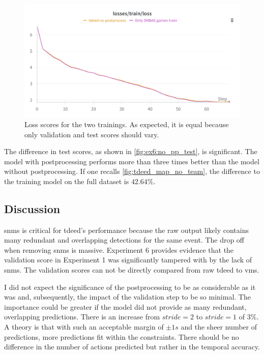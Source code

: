 \begin{figure}
    \centering
    \includegraphics[width=0.75\linewidth]{figures/no_pprocess_loss.png}
    \caption{Loss scores for the two trainings. As expected, it is equal because only validation and test scores should vary.}
    \label{fig:ex6:no_pp_loss}
\end{figure}

The difference in test scores, as shown in \cref{fig:ex6:no_pp_test}, is significant. The model with postprocessing performs more than three times better than the model without postprocessing. If one recalls \cref{fig:tdeed_map_no_team}, the difference to the training model on the full dataset is $42.64\%$. 

\subsection{Discussion}
\label{ssec:ex6_discussion}

\acrfull{snms} is critical for \acrshort{tdeed}'s performance because the raw output likely contains many redundant and overlapping detections for the same event. The drop off when removing \acrshort{snms} is massive. Experiment 6 provides evidence that the validation score in Experiment 1 was significantly tampered with by the lack of \acrshort{snms}. The validation scores can not be directly compared from raw \acrshort{tdeed} to \acrshort{vms}. 

I did not expect the significance of the postprocessing to be as considerable as it was and, subsequently, the impact of the validation step to be so minimal. The importance could be greater if the model did not provide as many redundant, overlapping predictions. There is an increase from $stride=2$ to $stride=1$ of $3\%$. A theory is that with such an acceptable margin of $\pm1s$ and the sheer number of predictions, more predictions fit within the constraints. There should be no difference in the number of actions predicted but rather in the temporal accuracy. 

